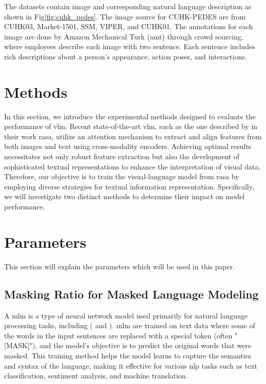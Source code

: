 The datasets contain image and corresponding natural language description as shown in Fig\ref{fig:cuhk_pedes}. The image source for CUHK-PEDES are from CUHK03, Market-1501, SSM, VIPER, and CUHK01. The annotations for each image are done by Amazon Mechanical Turk (\acrshort{amt}) through crowd sourcing, where employees describe each image with two sentence. Each sentence includes rich descriptions about a person's appearance, action poses, and interactions.

\section{Methods}
In this section, we introduce the experimental methods designed to evaluate the performance of \acrshort{vlm}. Recent state-of-the-art \acrshort{vlm}, such as the one described by \cite{Bai2023RaSaRA} in their work \acrshort{rasa}, utilize an attention mechanism to extract and align features from both images and text using cross-modality encoders. Achieving optimal results necessitates not only robust feature extraction but also the development of sophisticated textual representations to enhance the interpretation of visual data. Therefore, our objective is to train the visual-language model from \acrshort{rasa} by employing diverse strategies for textual information representation. Specifically, we will investigate two distinct methods to determine their impact on model performance.


\section{Parameters}
This section will explain the parameters which will be used in this paper.

\subsection{Masking Ratio for Masked Language Modeling} 
A \acrfull{mlm} is a type of neural network model used primarily for natural language processing tasks, including (\cite{devlin2018bert} and \cite{Bai2023RaSaRA}). \acrshort{mlm} are trained on text data where some of the words in the input sentences are replaced with a special token (often "[MASK]"), and the model's objective is to predict the original words that were masked. This training method helps the model learns to capture the semantics and syntax of the language, making it effective for various \acrshort{nlp} tasks such as text classification, sentiment analysis, and machine translation.

